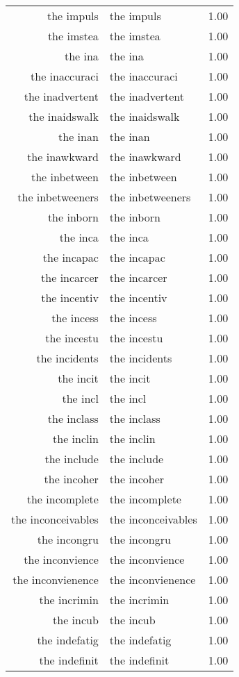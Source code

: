 \begin{table}[ht]
\begin{tabular}{rlr}
  the impuls & the impuls & 1.00 \\ 
  the imstea & the imstea & 1.00 \\ 
  the ina & the ina & 1.00 \\ 
  the inaccuraci & the inaccuraci & 1.00 \\ 
  the inadvertent & the inadvertent & 1.00 \\ 
  the inaidswalk & the inaidswalk & 1.00 \\ 
  the inan & the inan & 1.00 \\ 
  the inawkward & the inawkward & 1.00 \\ 
  the inbetween & the inbetween & 1.00 \\ 
  the inbetweeners & the inbetweeners & 1.00 \\ 
  the inborn & the inborn & 1.00 \\ 
  the inca & the inca & 1.00 \\ 
  the incapac & the incapac & 1.00 \\ 
  the incarcer & the incarcer & 1.00 \\ 
  the incentiv & the incentiv & 1.00 \\ 
  the incess & the incess & 1.00 \\ 
  the incestu & the incestu & 1.00 \\ 
  the incidents & the incidents & 1.00 \\ 
  the incit & the incit & 1.00 \\ 
  the incl & the incl & 1.00 \\ 
  the inclass & the inclass & 1.00 \\ 
  the inclin & the inclin & 1.00 \\ 
  the include & the include & 1.00 \\ 
  the incoher & the incoher & 1.00 \\ 
  the incomplete & the incomplete & 1.00 \\ 
  the inconceivables & the inconceivables & 1.00 \\ 
  the incongru & the incongru & 1.00 \\ 
  the inconvience & the inconvience & 1.00 \\ 
  the inconvienence & the inconvienence & 1.00 \\ 
  the incrimin & the incrimin & 1.00 \\ 
  the incub & the incub & 1.00 \\ 
  the indefatig & the indefatig & 1.00 \\ 
  the indefinit & the indefinit & 1.00 \\ 

\end{tabular}
\end{table}
